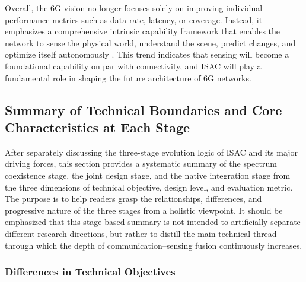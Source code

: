 Overall, the 6G vision no longer focuses solely on improving individual performance metrics such as data rate, latency, or coverage. Instead, it emphasizes a comprehensive intrinsic capability framework that enables the network to sense the physical world, understand the scene, predict changes, and optimize itself autonomously \cite{Liu2022ISAC,Gonzalez2024integrated,Saad2020Vision6G}. This trend indicates that sensing will become a foundational capability on par with connectivity, and ISAC will play a fundamental role in shaping the future architecture of 6G networks.

\subsection{Summary of Technical Boundaries and Core Characteristics at Each Stage}
\label{subsec:ch1-evolution-summary}

After separately discussing the three-stage evolution logic of ISAC and its major driving forces, this section provides a systematic summary of the spectrum coexistence stage, the joint design stage, and the native integration stage from the three dimensions of technical objective, design level, and evaluation metric. The purpose is to help readers grasp the relationships, differences, and progressive nature of the three stages from a holistic viewpoint. It should be emphasized that this stage-based summary is not intended to artificially separate different research directions, but rather to distill the main technical thread through which the depth of communication--sensing fusion continuously increases.

\subsubsection{Differences in Technical Objectives}
\label{subsubsec:ch1-target-differences}

